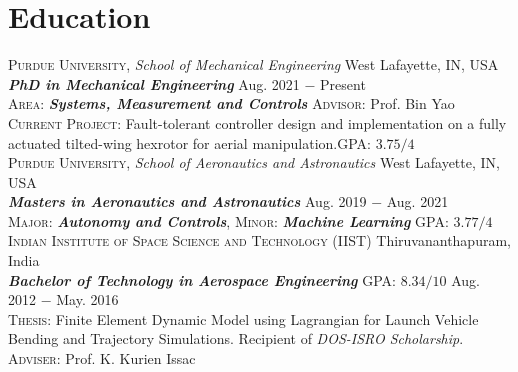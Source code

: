 \documentclass[letterpaper,10pt]{article}
\begin{document}
\renewcommand\refname{Publications}
\nocite{improvBandwidth}


\section{Education}
\noindent \textsc{Purdue University}, \textit{School of Mechanical Engineering} \hfill West Lafayette, IN, USA \\
\textbf{\textit{PhD in Mechanical Engineering}} \hfill Aug. 2021 $-$ Present\\
\textsc{Area}: \textit{\textbf{Systems, Measurement and Controls}}  \hfill \textsc{Advisor}: Prof. Bin Yao\\
\textsc{Current Project}: Fault-tolerant controller design and implementation on
a fully actuated tilted-wing hexrotor for aerial manipulation.\hfill \textsc{GPA}: $3.75/4$\\
\vspace{5pt}
\noindent \textsc{Purdue University}, \textit{School of Aeronautics and Astronautics} \hfill West Lafayette, IN, USA \\
\textbf{\textit{Masters in Aeronautics and Astronautics}} \hfill Aug. 2019 $-$ Aug. 2021\\
\textsc{Major}: \textit{\textbf{Autonomy and Controls}}, \textsc{Minor}: \textit{\textbf{Machine Learning}}
\hfill \textsc{GPA}: $3.77/4$\\

\vspace{5pt}
\noindent \textsc{Indian Institute of Space Science and Technology (IIST)} \hfill Thiruvananthapuram, India\\
\textbf{\textit{Bachelor of Technology in Aerospace Engineering}} \hfill \textsc{GPA}: $8.34/10$ \hfill Aug. 2012 $-$ May. 2016 \\
\textsc{Thesis}: Finite Element Dynamic Model using Lagrangian for Launch
Vehicle Bending and Trajectory Simulations.
Recipient of \textit{DOS-ISRO Scholarship}.
\hfill \textsc{Adviser}: Prof. K. Kurien Issac \\
\end{document}
